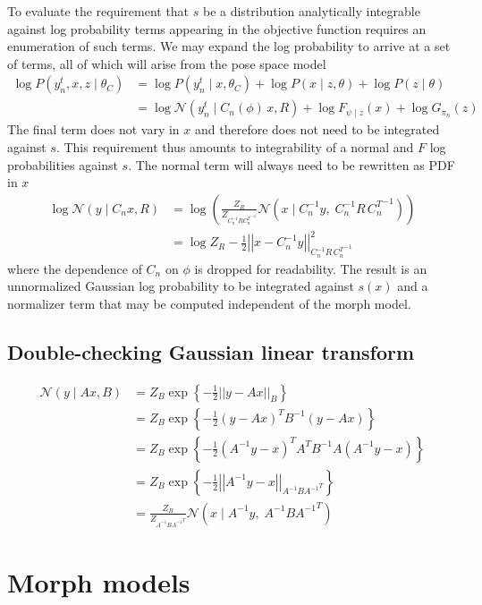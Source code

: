 \documentclass{article}         %
\newcommand{\inv}{^{-1}}
\newcommand{\NN}{\mathcal{N}}
\newcommand{\norm}[1]{\left|\left| #1 \right|\right|}
\newcommand{\cb}[1]{\left\{ #1 \right\}}
\newcommand{\pn}[1]{\left( #1 \right)}
\begin{document}
To evaluate the requirement that $s$ be a distribution analytically integrable against log probability terms appearing in the objective function requires an enumeration of such terms. We may expand the log probability to arrive at a set of terms, all of which will arise from the pose space model
\begin{align}
    \log P(y^t_n, x, z \mid \theta_C) &= \log P(y^t_n \mid x, \theta_C) + \log P(x\mid z, \theta) + \log P(z\mid \theta) \\
    &= \log \NN(y^t_n \mid C_n(\phi)\, x, R) + \log F_{\psi\mid z}(x) + \log G_{\pi_n}(z)
    \label{eq:logprob-terms}
\end{align}
The final term does not vary in $x$ and therefore does not need to be integrated against $s$. This requirement thus amounts to integrability of a normal and $F$ log probabilities against $s$. The normal term will always need to be rewritten as PDF in $x$
\begin{align}
    \log \NN(y\mid C_n x, R) &= \log\pn{\frac{Z_{R}}{Z_{C_n\inv R {C_n^T}\inv}} \NN\pn{x\mid C_n\inv y,\; C_n\inv R\, {C_n^T}\inv}} \\ &= \log Z_{R} - \frac{1}{2}\norm{x - C_n\inv y}^2_{C_n\inv R\, {C_n^T}\inv}
    \label{eq:cn-swap}
\end{align}
where the dependence of $C_n$ on $\phi$ is dropped for readability. The result is an unnormalized Gaussian log probability to be integrated against $s(x)$ and a normalizer term that may be computed independent of the morph model. 

\subsection{Double-checking Gaussian linear transform}

\begin{align}
    \NN(y\mid Ax, B) &= Z_{B} \exp\cb{-\frac{1}{2}\norm{y - Ax}_{B}} \\
    &= Z_{B} \exp\cb{-\frac{1}{2}(y - Ax)^TB\inv(y - Ax)} \\
    &= Z_{B} \exp\cb{-\frac{1}{2}(A\inv y - x)^TA^TB\inv A(A\inv y - x)} \\
    &= Z_{B} \exp\cb{-\frac{1}{2}\norm{A\inv y - x}_{A\inv B{A\inv}^T}} \\
    &= \frac{Z_{B}}{Z_{A\inv B{A\inv}^T}} \NN\pn{x\mid A\inv y, \; A\inv B{A\inv}^T}
\end{align}

\section{Morph models}
\end{document}
